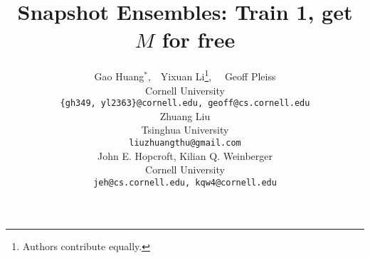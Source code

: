 \documentclass{article} %
\title{Snapshot Ensembles: Train 1, get $M$ for free}
\author{Gao Huang$^*$,~~Yixuan Li\thanks{Authors contribute equally.}, ~~Geoff Pleiss   \\
Cornell University\\
\texttt{\{gh349, yl2363\}@cornell.edu, geoff{@cs.cornell.edu}} \\
\And
Zhuang Liu \\
Tsinghua University\\
\texttt{liuzhuangthu@gmail.com} \\
\And
John E. Hopcroft, Kilian Q. Weinberger \\
Cornell University\\
\texttt{jeh@cs.cornell.edu, kqw4@cornell.edu} \\
}
\begin{document}
\maketitle

\begin{abstract}

\end{abstract}















\newpage

\end{document}
